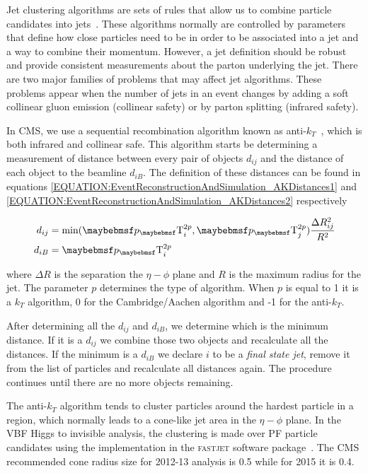 
Jet clustering algorithms are sets of rules that allow us to combine particle candidates into jets~\cite{ARTICLE:TowardsJetography}. These algorithms normally are controlled by parameters that define how close particles need to be in order to be associated into a jet and a way to combine their momentum. However, a jet definition should be robust and provide consistent measurements about the parton underlying the jet. There are two major families of problems that may affect jet algorithms. These problems appear when the number of jets in an event changes by adding a soft collinear gluon emission (collinear safety) or by parton splitting (infrared safety). 

In \gls{CMS}, we use a sequential recombination algorithm known as anti-$k_T$~\cite{ARTICLE:AntiKtAlgorithm}, which is both infrared and collinear safe. This algorithm starts be determining a measurement of distance between every pair of objects $d_{ij}$ and the distance of each object to the beamline $d_{iB}$. The definition of these distances can be found in equations \ref{EQUATION:EventReconstructionAndSimulation_AKDistances1} and \ref{EQUATION:EventReconstructionAndSimulation_AKDistances2} respectively

\begin{align}
d_{ij} &= \text{min}({\pT}_{i}^{2p},{\pT}_{j}^{2p})\frac{\Delta R_{ij}^{2}}{R^{2}} \label{EQUATION:EventReconstructionAndSimulation_AKDistances1} \\
d_{iB} &= {\pT}_{i}^{2p}\ \label{EQUATION:EventReconstructionAndSimulation_AKDistances2} 
\end{align}

where $\Delta R$ is the separation the $\eta-\phi$ plane and $R$ is the maximum radius for the jet. The parameter $p$ determines the type of algorithm. When $p$ is equal to 1 it is a $k_T$ algorithm, 0 for the Cambridge/Aachen algorithm and -1 for the anti-$k_T$. 

After determining all the $d_{ij}$ and $d_{iB}$, we determine which is the minimum distance. If it is a $d_{ij}$ we combine those two objects and recalculate all the distances. If the minimum is a $d_{iB}$ we declare $i$ to be a \textit{final state jet}, remove it from the list of particles and recalculate all distances again. The procedure continues until there are no more objects remaining.

The anti-$k_T$ algorithm tends to cluster particles around the hardest particle in a region, which normally leads to a cone-like jet area in the $\eta-\phi$ plane. In the \gls{VBF} Higgs to invisible analysis, the clustering is made over \gls{PF} particle candidates using the implementation in the \textsc{fastjet} software package~\cite{ARTICLE:FastJetUserManual}. The \gls{CMS} recommended cone radius size for 2012-13 analysis is 0.5 while for 2015 it is 0.4.

